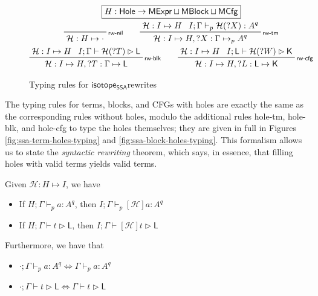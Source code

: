 \documentclass[acmsmall,screen,review]{acmart}
\newcommand{\mc}[1]{\ensuremath{\mathcal{#1}}}
\newcommand{\ms}[1]{\ensuremath{\mathsf{#1}}}
\newcommand{\rle}[1]{{\scriptsize\textsf{#1}}}
\newcommand{\hasty}[5]{#1 \vdash_{#2} #3: {#4}^{#5}}
\newcommand{\haslb}[3]{#1 \vdash #2 \rhd #3}
\newcommand{\lhole}[1]{?#1}
\newcommand{\mhasty}[6]{#1;#2 \vdash_{#3} #4: {#5}^{#6}}
\newcommand{\mhaslb}[4]{#1;#2 \vdash #3 \rhd #4}
\newcommand{\mlhaslb}[4]{#1;#2 \vdash #3 \rhd #4}
\newcommand{\tyhole}[5]{#1: #2 \mapsto_{#3} {#4}^{#5}}
\newcommand{\blkhole}[3]{#1: #2 \mapsto #3}
\newcommand{\cfghole}[3]{#1: #2 \mapsto #3}
\newcommand{\isrw}[3]{#1: #2 \mapsto #3}
\newcommand{\isotopessa}{\ms{isotope_{SSA}}}
\begin{document}
\begin{figure}
  \begin{gather*}
    \boxed{H: \ms{Hole} \to \ms{MExpr} \sqcup \ms{MBlock} \sqcup \ms{MCfg}}
    \\
    \prftree[r]{\rle{rw-nil}}
      {\isrw{\mc{H}}{H}{\cdot}}
    \qquad
    \prftree[r]{\rle{rw-tm}}
      {\isrw{\mc{H}}{I}{H}}
      {\mhasty{I}{\Gamma}{p}{\mc{H}(\lhole{X})}{A}{q}}
      {\isrw{\mc{H}}{I}{H, \tyhole{\lhole{X}}{\Gamma}{p}{A}{q}}}
    \\
    \prftree[r]{\rle{rw-blk}}
      {\isrw{\mc{H}}{I}{H}}
      {\mhaslb{I}{\Gamma}{\mc{H}(\lhole{T})}{\ms{L}}}
      {\isrw{\mc{H}}{I}{H, \blkhole{\lhole{T}}{\Gamma}{\ms{L}}}}
    \qquad
    \prftree[r]{\rle{rw-cfg}}
      {\isrw{\mc{H}}{I}{H}}
      {\mlhaslb{I}{\ms{L}}{\mc{H}(\lhole{W})}{\ms{K}}}
      {\isrw{\mc{H}}{I}{H, \cfghole{\lhole{L}}{\ms{L}}{\ms{K}}}}
  \end{gather*}
  \caption{Typing rules for \isotopessa rewrites}
  \label{fig:rewrite-typing}
\end{figure}

The typing rules for terms, blocks, and CFGs with holes are exactly the same as
the corresponding rules without holes, modulo the additional rules
\rle{hole-tm}, \rle{hole-blk}, and \rle{hole-cfg} to type the holes themselves;
they are given in full in Figures \ref{fig:ssa-term-holes-typing} and
\ref{fig:ssa-block-holes-typing}. This formalism allows us to state the
\textit{syntactic rewriting} theorem, which says, in essence, that filling holes
with valid terms yields valid terms.
\begin{theorem}[Rewriting]
  Given \(\isrw{\mc{H}}{H}{I}\), we have
  \begin{itemize}
    \item If \(\mhasty{H}{\Gamma}{p}{a}{A}{q}\), then \(\mhasty{I}{\Gamma}{p}{[\mc{H}]a}{A}{q}\)
    \item If \(\mhaslb{H}{\Gamma}{t}{\ms{L}}\), then \(\mhaslb{I}{\Gamma}{[\mc{H}]t}{\ms{L}}\)
  \end{itemize}
  Furthermore, we have that 
  \begin{itemize}
    \item \(\mhasty{\cdot}{\Gamma}{p}{a}{A}{q} \iff \hasty{\Gamma}{p}{a}{A}{q}\)
    \item \(\mhaslb{\cdot}{\Gamma}{t}{\ms{L}} \iff \haslb{\Gamma}{t}{\ms{L}}\)
  \end{itemize}
\end{theorem}
\end{document}
